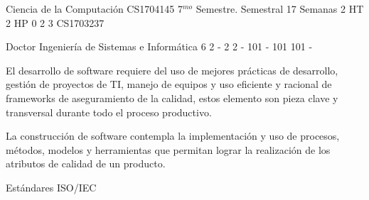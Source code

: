 \documentclass[a4paper,8pt]{article}
\begin{document}
\setNombreProfesor{}
\setGradoProfesorAbreviado{}
\sylabusHeader

\academicaTable
{Ciencia de la Computación} %
{CS1704145} %
{7$^{mo}$ Semestre.} %
{Semestral} %
{17 Semanas} %
{2 HT} %
{2 HP} %
{0} %
{}  %
{2} %
{3} %
{CS1703237} %

\administrativaTable
{Doctor} %
{Ingeniería de Sistemas e Informática} %
{6} %
{2} %
{-} %
{2} %
{2} %
{-} %
{101} %
{-} %
{101} %
{101} %
{-} %


\begin{fundamentacion}
El desarrollo de software requiere del uso de mejores prácticas de desarrollo, gestión de proyectos de TI, manejo de equipos 
y uso eficiente y racional de frameworks de aseguramiento de la calidad, estos elemento son pieza clave y transversal durante 
todo el proceso productivo.

La construcción de software contempla la implementación y uso de procesos, métodos, modelos y herramientas que permitan lograr 
la realización de los atributos de calidad de un producto.

\end{fundamentacion}

\begin{sumilla}
\item \SESoftwareEvolution
\item \SESoftwareProjectManagement
\item \SESoftwareProjectManagement
\item \SESoftwareProcesses
\item Estándares ISO/IEC

\end{sumilla}

\begin{competenciasAsignatura}
\item {}
\item {}
\item {}
\item {}
\item {}
\item {}
\item {}
\item {}
\item {}

\end{competenciasAsignatura}
\end{document}
